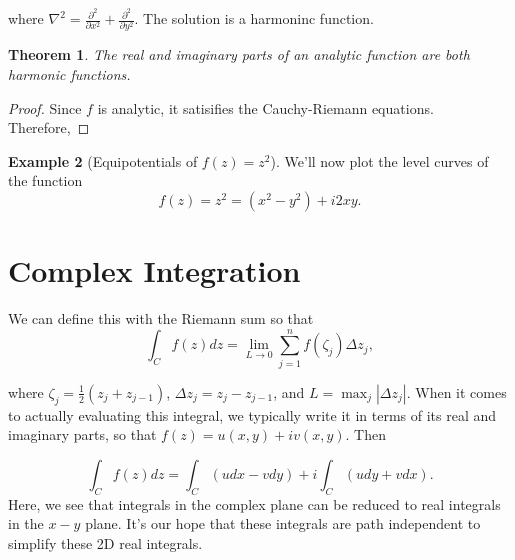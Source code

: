 \documentclass[12pt]{article}
\newcommand{\abs}[1]{ \left| #1 \right| }
\newtheorem{thm}{Theorem}[section]
\theoremstyle{definition}
\newtheorem{exmp}[thm]{Example}
\theoremstyle{remark}
\numberwithin{equation}{section}
\begin{document}
where $\nabla^2 = \frac{\partial^2}{\partial x^2} + \frac{\partial^2}{\partial y^2}$. The solution is a harmoninc function.

\begin{thm}
  The real and imaginary parts of an analytic function are both harmonic functions.
\end{thm}

\begin{proof}
  Since $f$ is analytic, it satisifies the Cauchy-Riemann equations. Therefore,

\end{proof}


\begin{exmp}[Equipotentials of $f(z)=z^2$]
We'll now plot the level curves of the function
  \begin{equation}
    f(z) = z^2 = (x^2 - y^2) + i 2xy.
  \end{equation}

\end{exmp}


\section{Complex Integration}%
\label{sec:complex_integration}


We can define this with the Riemann sum so that
\begin{equation}
  \int_C f(z)dz = \lim\limits_{L \to 0} \sum_{j=1}^{n} f(\zeta_j)\Delta z_j,
\end{equation}

where $\zeta_j = \frac{1}{2}(z_j + z_{j-1})$, $\Delta z_j = z_{j} - z_{j-1}$, and $L = \max_{j}\abs{\Delta z_j}$. When it comes to actually evaluating this integral, we typically write it in terms of its real and imaginary parts, so that $f(z) = u(x,y) + iv(x,y)$. Then

\begin{equation}
  \int_C f(z)dz = \int_C (u dx -v dy) + i\int_C (u dy + vdx).
\end{equation}
Here, we see that integrals in the complex plane can be reduced to real integrals in the $x-y$ plane. It's our hope that these integrals are path independent to simplify these 2D real integrals.
\end{document}
